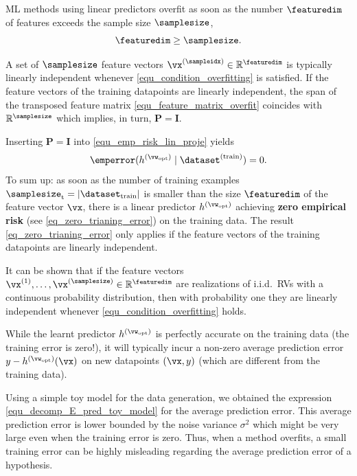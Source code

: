 \documentclass[12pt]{report}
\begin{document}
ML methods using linear predictors overfit as soon as the 
number $\featuredim$ of features exceeds the sample size $\samplesize$,
\begin{equation} 
\label{equ_condition_overfitting}
\featuredim  \geq \samplesize. 
\end{equation} 

A set of $\samplesize$ feature vectors $\vx^{(\sampleidx)} \in \mathbb{R}^{\featuredim}$ 
is typically linearly independent whenever \eqref{equ_condition_overfitting} is satisfied. 
If the feature vectors of the training datapoints are linearly independent, 
the span of the transposed feature matrix \eqref{equ_feature_matrix_overfit} 
coincides with $\mathbb{R}^{\samplesize}$ which implies, in turn, $\mathbf{P} = \mathbf{I}$. 

Inserting $\mathbf{P} = \mathbf{I}$ into \eqref{equ_emp_risk_lin_proje} yields 
\begin{equation}
\label{eq_zero_trianing_error}
\emperror(h^{(\vw_{\rm opt})} \mid \dataset^{(\rm train)}) = 0.
\end{equation} 
To sum up: as soon as the number of training examples $\samplesize_{\rm t} = | \dataset_{\rm train}|$ is smaller 
than the size $\featuredim$ of the feature vector $\vx$, there 
is a linear predictor $h^{(\vw_{\rm opt})}$ achieving {\bf zero empirical risk} 
(see \eqref{eq_zero_trianing_error}) on the training data. The result 
\eqref{eq_zero_trianing_error} only applies if the feature vectors of 
the training datapoints are linearly independent. 

It can be shown that if the feature vectors $\vx^{(1)},\ldots,\vx^{(\samplesize)} \in \mathbb{R}^{\featuredim}$ 
are realizations of i.i.d.\ RVs with a continuous probability distribution, 
then with probability one they are linearly independent whenever \eqref{equ_condition_overfitting} holds. 

While the learnt predictor $h^{(\vw_{\rm opt})}$ is perfectly accurate on the training 
data (the training error is zero!), it will typically incur a non-zero average prediction error 
$y - h^{(\vw_{\rm opt})}(\vx)$ on new datapoints $(\vx,y)$ (which are different from the 
training data). 

Using a simple toy model for the data generation, we obtained the expression 
\eqref{equ_decomp_E_pred_toy_model} for the average prediction error. This 
average prediction error is lower bounded by the noise variance $\sigma^{2}$ 
which might be very large even when the training error is zero. Thus, when a method overfits, 
a small training error can be highly misleading regarding the average prediction 
error of a hypothesis. 
\end{document}
